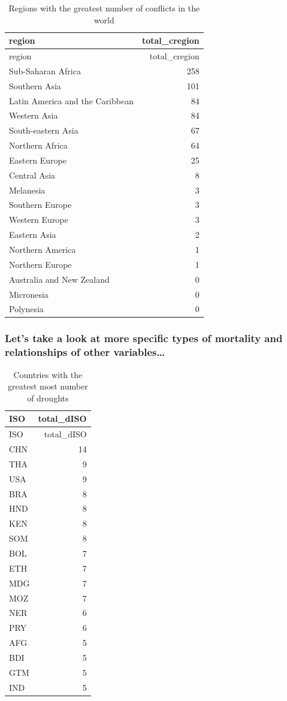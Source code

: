 \documentclass[
  letterpaper,
  DIV=11,
  numbers=noendperiod]{scrartcl}
\begin{document}
\begin{longtable}[]{@{}lr@{}}
\caption{Regions with the greatest number of conflicts in the
world}\tabularnewline
\toprule\noalign{}
region & total\_cregion \\
\midrule\noalign{}
\endfirsthead
\toprule\noalign{}
region & total\_cregion \\
\midrule\noalign{}
\endhead
\bottomrule\noalign{}
\endlastfoot
Sub-Saharan Africa & 258 \\
Southern Asia & 101 \\
Latin America and the Caribbean & 84 \\
Western Asia & 84 \\
South-eastern Asia & 67 \\
Northern Africa & 64 \\
Eastern Europe & 25 \\
Central Asia & 8 \\
Melanesia & 3 \\
Southern Europe & 3 \\
Western Europe & 3 \\
Eastern Asia & 2 \\
Northern America & 1 \\
Northern Europe & 1 \\
Australia and New Zealand & 0 \\
Micronesia & 0 \\
Polynesia & 0 \\
\end{longtable}

\subsubsection{Let's take a look at more specific types of mortality and
relationships of other
variables\ldots{}}\label{lets-take-a-look-at-more-specific-types-of-mortality-and-relationships-of-other-variables}

\begin{longtable}[]{@{}lr@{}}
\caption{Countries with the greatest most number of
droughts}\tabularnewline
\toprule\noalign{}
ISO & total\_dISO \\
\midrule\noalign{}
\endfirsthead
\toprule\noalign{}
ISO & total\_dISO \\
\midrule\noalign{}
\endhead
\bottomrule\noalign{}
\endlastfoot
CHN & 14 \\
THA & 9 \\
USA & 9 \\
BRA & 8 \\
HND & 8 \\
KEN & 8 \\
SOM & 8 \\
BOL & 7 \\
ETH & 7 \\
MDG & 7 \\
MOZ & 7 \\
NER & 6 \\
PRY & 6 \\
AFG & 5 \\
BDI & 5 \\
GTM & 5 \\
IND & 5 \\
\end{longtable}
\end{document}
